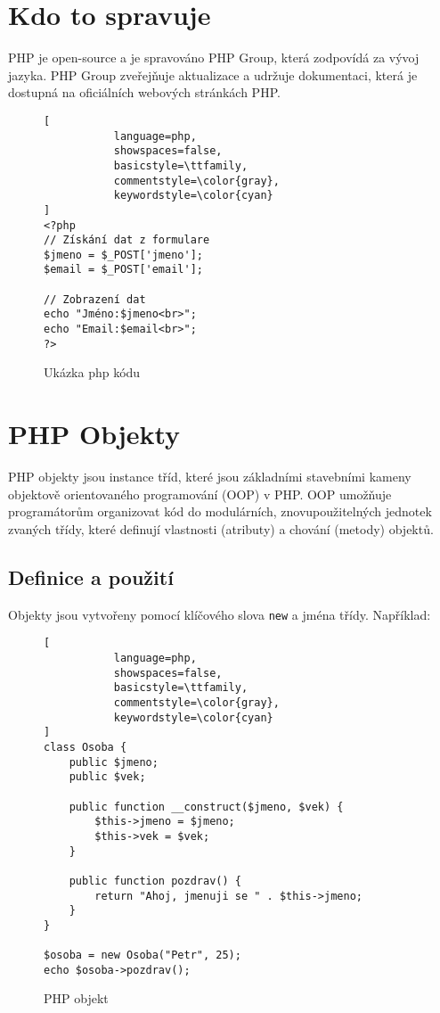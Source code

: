 \section{Kdo to spravuje}
PHP je open-source a je spravováno PHP Group, která zodpovídá za vývoj jazyka. PHP Group zveřejňuje aktualizace a udržuje dokumentaci, která je dostupná na oficiálních webových stránkách PHP.
\begin{figure}[H]
\centering
\begin{lstlisting}[
           language=php,
           showspaces=false,
           basicstyle=\ttfamily,
           commentstyle=\color{gray},
           keywordstyle=\color{cyan}
]
<?php
// Získání dat z formulare
$jmeno = $_POST['jmeno'];
$email = $_POST['email'];

// Zobrazení dat
echo "Jméno:$jmeno<br>";
echo "Email:$email<br>";
?>
\end{lstlisting}
\caption{Ukázka php kódu}
\label{fig:php_file}
\end{figure}


\section{PHP Objekty}
PHP objekty jsou instance tříd, které jsou základními stavebními kameny objektově orientovaného programování (OOP) v PHP. OOP umožňuje programátorům organizovat kód do modulárních, znovupoužitelných jednotek zvaných třídy, které definují vlastnosti (atributy) a chování (metody) objektů.

\subsection{Definice a použití}
Objekty jsou vytvořeny pomocí klíčového slova \texttt{new} a jména třídy. Například:

\begin{figure}[H]
\centering
\begin{lstlisting}[
           language=php,
           showspaces=false,
           basicstyle=\ttfamily,
           commentstyle=\color{gray},
           keywordstyle=\color{cyan}
]
class Osoba {
    public $jmeno;
    public $vek;

    public function __construct($jmeno, $vek) {
        $this->jmeno = $jmeno;
        $this->vek = $vek;
    }
    
    public function pozdrav() {
        return "Ahoj, jmenuji se " . $this->jmeno;
    }
}

$osoba = new Osoba("Petr", 25);
echo $osoba->pozdrav();
\end{lstlisting}
\caption{PHP objekt}
\label{fig:php_object}
\end{figure}


